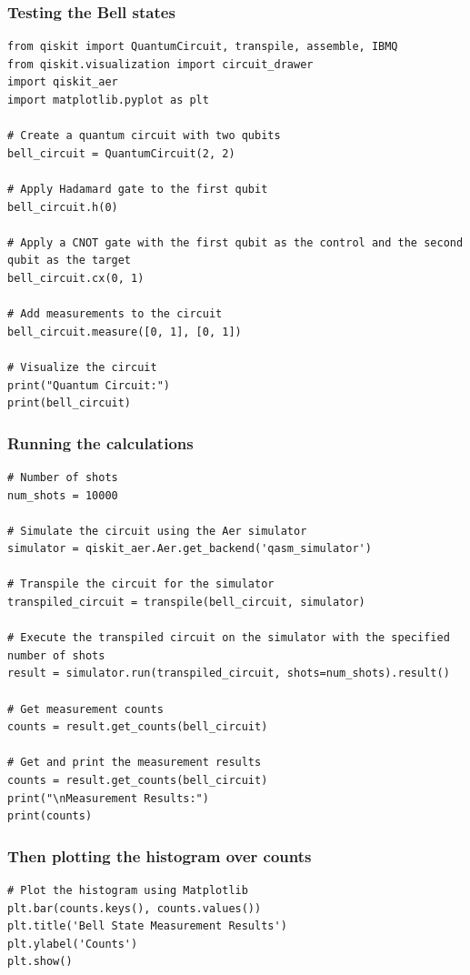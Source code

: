 \documentclass{beamer}
\begin{document}
\begin{frame}
\frametitle{Testing the Bell states}

\begin{verbatim}
from qiskit import QuantumCircuit, transpile, assemble, IBMQ
from qiskit.visualization import circuit_drawer
import qiskit_aer
import matplotlib.pyplot as plt

# Create a quantum circuit with two qubits
bell_circuit = QuantumCircuit(2, 2)

# Apply Hadamard gate to the first qubit
bell_circuit.h(0)

# Apply a CNOT gate with the first qubit as the control and the second qubit as the target
bell_circuit.cx(0, 1)

# Add measurements to the circuit
bell_circuit.measure([0, 1], [0, 1])

# Visualize the circuit
print("Quantum Circuit:")
print(bell_circuit)

\end{verbatim}
\end{frame}

\begin{frame}
\frametitle{Running the calculations}

\begin{verbatim}
# Number of shots
num_shots = 10000

# Simulate the circuit using the Aer simulator
simulator = qiskit_aer.Aer.get_backend('qasm_simulator')

# Transpile the circuit for the simulator
transpiled_circuit = transpile(bell_circuit, simulator)

# Execute the transpiled circuit on the simulator with the specified number of shots
result = simulator.run(transpiled_circuit, shots=num_shots).result()

# Get measurement counts
counts = result.get_counts(bell_circuit)

# Get and print the measurement results
counts = result.get_counts(bell_circuit)
print("\nMeasurement Results:")
print(counts)

\end{verbatim}
\end{frame}

\begin{frame}
\frametitle{Then plotting the histogram over counts}

\begin{verbatim}
# Plot the histogram using Matplotlib
plt.bar(counts.keys(), counts.values())
plt.title('Bell State Measurement Results')
plt.ylabel('Counts')
plt.show()

\end{verbatim}
\end{frame}
\end{document}
